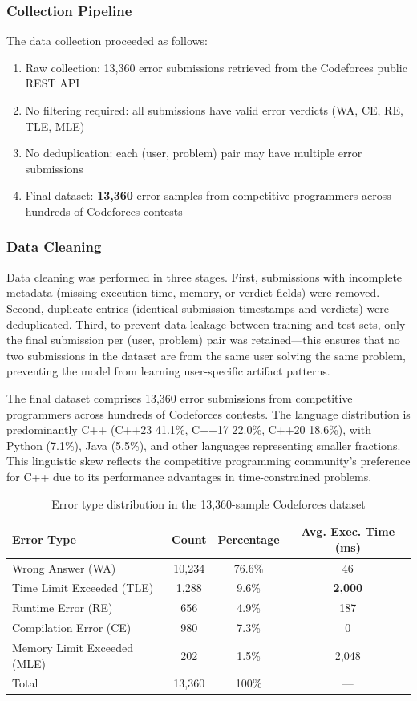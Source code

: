 \documentclass[10pt,a4paper]{article}
\begin{document}
\subsubsection*{Collection Pipeline}
The data collection proceeded as follows:
\begin{enumerate}
    \item Raw collection: 13,360 error submissions retrieved from the
          Codeforces public REST API
    \item No filtering required: all submissions have valid error verdicts
          (WA, CE, RE, TLE, MLE)
    \item No deduplication: each (user, problem) pair may have multiple error
          submissions
    \item Final dataset: \textbf{13,360} error samples from competitive
          programmers across hundreds of Codeforces contests
\end{enumerate}

\subsubsection*{Data Cleaning}
Data cleaning was performed in three stages. First, submissions with
incomplete metadata (missing execution time, memory, or verdict fields) were
removed. Second, duplicate entries (identical submission timestamps and
verdicts) were deduplicated. Third, to prevent data leakage between training
and test sets, only the final submission per (user, problem) pair was
retained---this ensures that no two submissions in the dataset are from the
same user solving the same problem, preventing the model from learning
user-specific artifact patterns.

The final dataset comprises 13,360 error submissions from competitive programmers
across hundreds of Codeforces contests. The language distribution
is predominantly C++ (C++23 41.1\%, C++17 22.0\%, C++20 18.6\%), with
Python (7.1\%), Java (5.5\%), and other languages representing smaller
fractions. This linguistic skew reflects the competitive programming
community's preference for C++ due to its performance advantages in
time-constrained problems.

\begin{table}[htbp]
\centering
\caption{Error type distribution in the 13,360-sample Codeforces dataset}
\label{tab:error-dist}
\begin{tabular}{@{}lccc@{}}
\toprule
Error Type & Count & Percentage & Avg. Exec. Time (ms) \\
\midrule
Wrong Answer (WA)           & 10,234 & 76.6\% & 46 \\
Time Limit Exceeded (TLE)   & 1,288  & 9.6\% & \textbf{2,000} \\
Runtime Error (RE)          & 656    & 4.9\% & 187 \\
Compilation Error (CE)      & 980    & 7.3\% & 0 \\
Memory Limit Exceeded (MLE) & 202    & 1.5\% & 2,048 \\
\midrule
Total                       & 13,360 & 100\% & --- \\
\bottomrule
\end{tabular}
\end{table}
\end{document}
